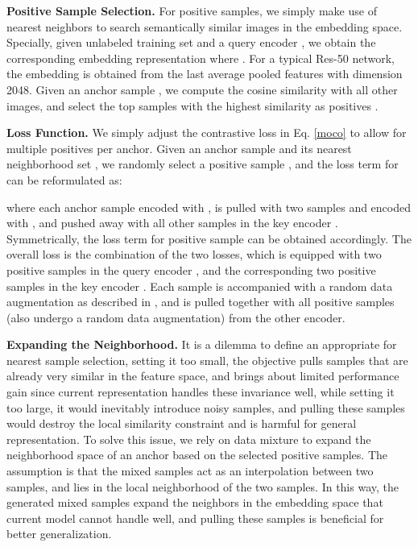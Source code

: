 \documentclass[10pt,twocolumn,letterpaper]{article}
\begin{document}
\textbf{Positive Sample Selection.} For positive samples, we simply make use of  nearest neighbors to search semantically similar images in the embedding space. Specially, given unlabeled training set  and a query encoder , we obtain the corresponding embedding representation  where . For a typical Res-50 network, the embedding is obtained from the last average pooled features with dimension 2048. Given an anchor sample , we compute the cosine similarity with all other images, and  select the top  samples with the highest similarity as positives .


\textbf{Loss Function.} We simply adjust the contrastive loss in Eq. \ref{moco} to allow for multiple positives per anchor. Given an anchor sample  and its nearest neighborhood set , we randomly select a positive sample , and the loss term  for  can be reformulated as:


where each anchor sample  encoded with , is pulled with two samples  and  encoded with , and pushed away with all other samples in the key encoder . Symmetrically, the loss term  for positive sample  can be obtained accordingly. The overall loss is the combination of the two losses, which is equipped with two positive samples in the query encoder , and the corresponding two positive samples in the key encoder . Each sample is accompanied with a random data augmentation as described in \cite{chen2020improved}, and is pulled together with all positive samples (also undergo a random data augmentation) from the other encoder.



\textbf{Expanding the Neighborhood.} It is a dilemma to define an appropriate  for nearest sample selection, setting it too small, the objective pulls samples that are already very similar in the feature space, and brings about limited performance gain since current representation handles these invariance well, while setting it too large, it would inevitably introduce noisy samples, and pulling these samples would destroy the local similarity constraint and is harmful for general representation. To solve this issue, we rely on data mixture to expand the neighborhood space of an anchor based on the selected positive samples. The assumption is that the mixed samples act as an interpolation between two samples, and lies in the local neighborhood of the two samples. In this way, the generated mixed samples expand the neighbors in the embedding space that current model cannot handle well, and pulling these samples is beneficial for better generalization.
\end{document}
